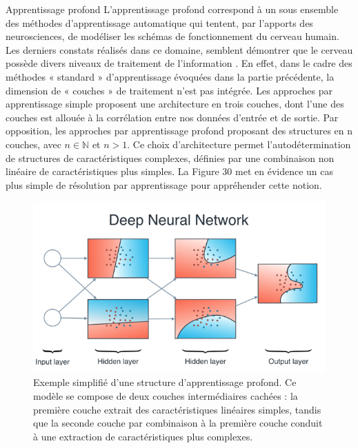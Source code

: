 	

Apprentissage profond
L’apprentissage profond correspond à un sous ensemble des méthodes d’apprentissage automatique qui tentent, par l’apports des neurosciences, de modéliser les schémas de fonctionnement du cerveau humain. Les derniers constats réalisés dans ce domaine, semblent démontrer que le cerveau possède divers niveaux de traitement de l’information . 
En effet, dans le cadre des méthodes « standard » d’apprentissage évoquées dans la partie précédente, la dimension de « couches » de traitement n’est pas intégrée. Les approches par apprentissage simple proposent une architecture en trois couches, dont l’une des couches est allouée à la corrélation entre nos données d’entrée et de sortie. Par opposition, les approches par apprentissage profond proposant des structures en n couches, avec $n \in \pmb{\mathbb{N}}$ et $n>1$. 
Ce choix d’architecture permet l’autodétermination de structures de caractéristiques complexes, définies par une combinaison non linéaire de caractéristiques plus simples. La  Figure 30 met en évidence un cas plus simple de résolution par apprentissage pour appréhender cette notion. 
 
\begin{figure}[H]
    \centering
    \includegraphics[width=\linewidth]{contents/chapter_3/resources/dnn_understanding.png}
    \caption{Exemple simplifié d'une structure d’apprentissage profond. Ce modèle se compose de deux couches intermédiaires cachées : la première couche extrait des caractéristiques linéaires simples, tandis que la seconde couche par combinaison à la première couche conduit à une extraction de caractéristiques plus complexes.}
    \label{fig:dnn_understanding}
\end{figure}


